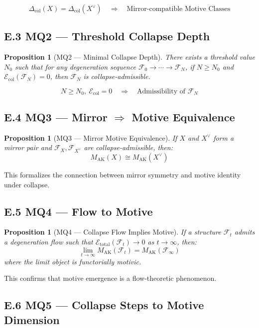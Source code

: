 \documentclass[11pt]{article}
\newtheorem{proposition}[theorem]{Proposition}
\begin{document}
\[
\boxed{\Delta_{\mathrm{col}}(X) = \Delta_{\mathrm{col}}(X^\vee) \quad \Rightarrow \quad \text{Mirror-compatible Motive Classes}}
\]

\subsection*{E.3 MQ2 — Threshold Collapse Depth}

\begin{proposition}[MQ2 — Minimal Collapse Depth]
There exists a threshold value $N_0$ such that for any degeneration sequence $\mathcal{F}_0 \to \cdots \to \mathcal{F}_N$, if $N \geq N_0$ and $\mathcal{E}_{\mathrm{col}}(\mathcal{F}_N) = 0$, then $\mathcal{F}_N$ is collapse-admissible.
\end{proposition}

\[
N \geq N_0, \ \mathcal{E}_{\mathrm{col}} = 0 \quad \Rightarrow \quad \text{Admissibility of } \mathcal{F}_N
\]

\subsection*{E.4 MQ3 — Mirror $\Rightarrow$ Motive Equivalence}

\begin{proposition}[MQ3 — Mirror Motive Equivalence]
If $X$ and $X^\vee$ form a mirror pair and $\mathcal{F}_X, \mathcal{F}_{X^\vee}$ are collapse-admissible, then:
\[
M_{\mathrm{AK}}(X) \cong M_{\mathrm{AK}}(X^\vee)
\]
\end{proposition}

This formalizes the connection between mirror symmetry and motive identity under collapse.

\subsection*{E.5 MQ4 — Flow to Motive}

\begin{proposition}[MQ4 — Collapse Flow Implies Motive]
If a structure $\mathcal{F}_t$ admits a degeneration flow such that $\mathcal{E}_{\mathrm{total}}(\mathcal{F}_t) \to 0$ as $t \to \infty$, then:
\[
\lim_{t \to \infty} M_{\mathrm{AK}}(\mathcal{F}_t) = M_{\mathrm{AK}}(\mathcal{F}_\infty)
\]
where the limit object is functorially motivic.
\end{proposition}

This confirms that motive emergence is a flow-theoretic phenomenon.

\subsection*{E.6 MQ5 — Collapse Steps to Motive Dimension}
\end{document}
